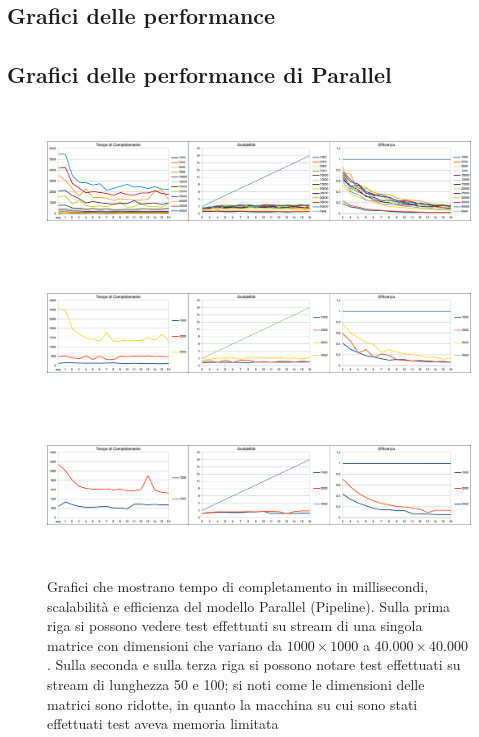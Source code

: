 \documentclass[a4paper,10pt]{article}
\begin{document}
\begin{landscape}
\appendix
\section{Grafici delle performance}
\label{appendix}
\subsection{Grafici delle performance di \textsf{Parallel}}


\begin{figure}[ht]
\centering
\includegraphics[height=3.9cm]{plot1.png}
\includegraphics[height=3.9cm]{plot50.png}
\includegraphics[height=3.9cm]{plot100.png}


\caption{\small{Grafici che mostrano tempo di completamento in millisecondi, scalabilit\`a e efficienza del modello \textsf{Parallel} (\textsf{Pipeline}). Sulla prima riga si possono vedere test effettuati su stream di una singola matrice con dimensioni che variano da $1000 \times 1000$ a $40.000 \times 40.000$. Sulla seconda e sulla terza riga si possono notare test effettuati su stream di lunghezza 50 e 100; si noti come le dimensioni delle matrici sono ridotte, in quanto la macchina su cui sono stati effettuati test aveva memoria limitata}}
\label{fig:par}
\end{figure}


\end{landscape}
\end{document}
